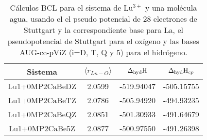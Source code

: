  \begin{center}                                                                            
 \begin{table}[h!]
 \centering
 \caption{\footnotesize C\'alculos BCL para el sistema de Lu$^{3+}$ y 
una mol\'ecula agua, usando el el pseudo potencial de 28 electrones 
de Stuttgart y la correspondiente base para La, el pseudopotencial
de Stuttgart para el ox\'igeno y las bases AUG-cc-pViZ (i=D, T, Q y 5)
para el hidr\'ogeno.}                                                                  
 \begin{tabular}{c|ccc}\hline\hline                                                          
 Sistema & $\langle r_{Ln-O}\rangle$ & $\Delta_{\textnormal{hyd}}\textnormal{H}$ 
 & $\Delta_{\textnormal{hyd}}\textnormal{H}_{cp}$ \\ \hline                                               
Lu1+0MP2CaBeDZ & 2.0599 & -519.94047 & -505.15755 \\
Lu1+0MP2CaBeTZ & 2.0786 & -505.94920 & -494.93235 \\
Lu1+0MP2CaBeQZ & 2.0851 & -501.30933 & -491.64679 \\
Lu1+0MP2CaBe5Z & 2.0877 & -500.97550 & -491.26398 \\
 \hline \end{tabular}
 \label{tLuCB}     
 \end{table}                                                           
 \end{center}                                                                              
